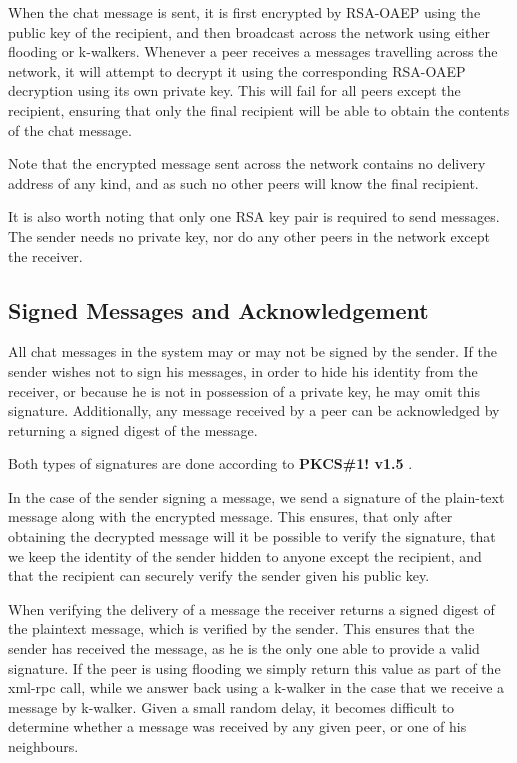 When the chat message is sent, it is first encrypted by RSA-OAEP using the public key of the recipient, and then broadcast across the network using either flooding or k-walkers. Whenever a peer receives a messages travelling across the network, it will attempt to decrypt it using the corresponding RSA-OAEP decryption using its own private key. This will fail for all peers except the recipient, ensuring that only the final recipient will be able to obtain the contents of the chat message.

Note that the encrypted message sent across the network contains no delivery address of any kind, and as such no other peers will know the final recipient.

It is also worth noting that only one RSA key pair is required to send messages. The sender needs no private key, nor do any other peers in the network except the receiver.

\subsection{Signed Messages and Acknowledgement}

All chat messages in the system may or may not be signed by the sender. If the sender wishes not to sign his messages, in order to hide his identity from the receiver, or because he is not in possession of a private key, he may omit this signature. Additionally, any message received by a peer can be acknowledged by returning a signed digest of the message.

Both types of signatures are done according to \textbf{PKCS\#1! v1.5} \citep{PKCS}.

In the case of the sender signing a message, we send a signature of the plain-text message along with the encrypted message. This ensures, that only after obtaining the decrypted message will it be possible to verify the signature, that we keep the identity of the sender hidden to anyone except the recipient, and that the recipient can securely verify the sender given his public key.

When verifying the delivery of a message the receiver returns a signed digest of the plaintext message, which is verified by the sender. This ensures that the sender has received the message, as he is the only one able to provide a valid signature. If the peer is using flooding we simply return this value as part of the xml-rpc call, while we answer back using a k-walker in the case that we receive a message by k-walker. Given a small random delay, it becomes difficult to determine whether a message was received by any given peer, or one of his neighbours. 

